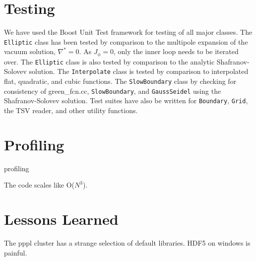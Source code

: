 \documentclass[paper=letter, fontsize=11pt]{scrartcl} %
\begin{document}
\section{Testing}

We have used the Boost Unit Test framework for testing of all major classes. The \texttt{Elliptic} class has been tested by comparison to the multipole expansion of the vacuum solution, $\nabla^* = 0$. As $J_{\phi} = 0$, only the inner loop needs to be iterated over. The \texttt{Elliptic} class is also tested by comparison to the analytic Shafranov-Solovev solution. The \texttt{Interpolate} class is tested by comparison to interpolated flat, quadratic, and cubic functions. The \texttt{SlowBoundary} class by checking for consistency of green\_fcn.cc, \texttt{SlowBoundary}, and \texttt{GaussSeidel} using the Shafranov-Solovev solution. Test suites have also be written for \texttt{Boundary}, \texttt{Grid}, the TSV reader, and other utility functions.


\section{Profiling}

profiling

The code scales like O($N^3$). 


\section{Lessons Learned}

The pppl cluster has a strange selection of default libraries.
HDF5 on windows is painful.
\end{document}
